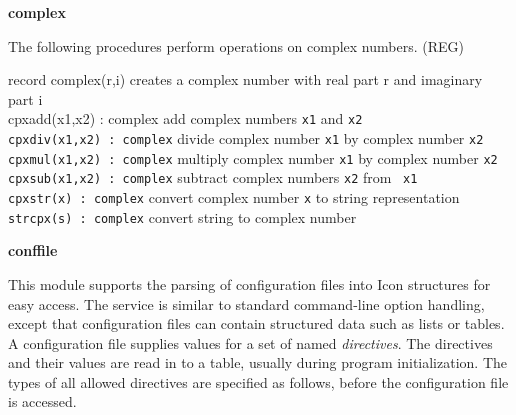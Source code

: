 
{\sffamily\bfseries
complex}

The following procedures perform operations on complex numbers. (REG)

\textsf{record complex(r,i)} creates a complex number with real part r
and imaginary part i\\
\textsf{cpxadd(x1,x2) : complex} add complex numbers \texttt{x1} and
\texttt{x2}\\
\texttt{cpxdiv(x1,x2) : complex} divide complex number \texttt{x1} by
complex number \texttt{x2}\\
\texttt{cpxmul(x1,x2) : complex} multiply complex number \texttt{x1} by
complex number \texttt{x2}\\
\texttt{cpxsub(x1,x2) : complex} subtract complex numbers \texttt{x2}
from \ \texttt{x1}\\
\texttt{cpxstr(x) : complex} convert complex number \texttt{x} to string
representation\\
\texttt{strcpx(s) : complex} convert string to complex number 

{\sffamily\bfseries
conffile}

This module supports the parsing of configuration files into Icon
structures for easy access. The service is similar to standard
command-line option handling, except that configuration files can
contain structured data such as lists or tables. A configuration file
supplies values for a set of named \textit{directives}. The directives
and their values are read in to a table, usually during program
initialization. The types of all allowed directives are specified as
follows, before the configuration file is accessed.

